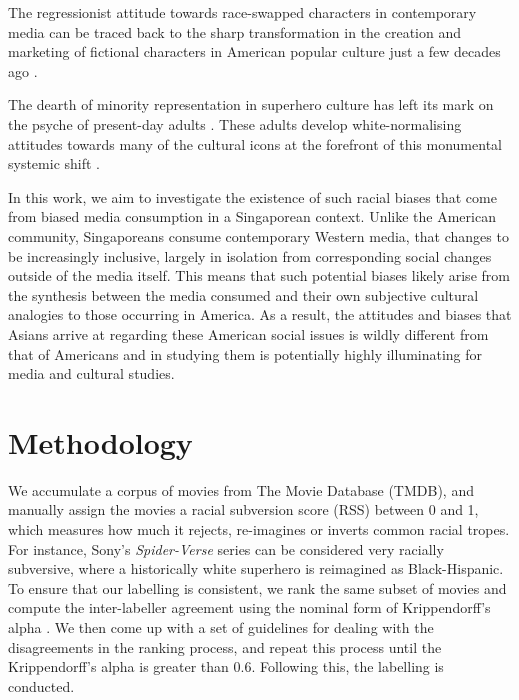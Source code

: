 \documentclass[%
 reprint,
 amsmath,amssymb,
 aps,
]{revtex4-2}
\begin{document}
The regressionist attitude towards race-swapped characters in contemporary media can be traced back to the sharp transformation in the creation and marketing of fictional characters in American popular culture just a few decades ago \cite{fu_fear_2015}.

The dearth of minority representation in superhero culture has left its mark on the psyche of present-day adults \cite{fu_fear_2015, mastro_portrayal_2000, dennis_gazing_2009}. These adults develop white-normalising attitudes towards many of the cultural icons at the forefront of this monumental systemic shift \cite{holtzman_media_2014}.

In this work, we aim to investigate the existence of such racial biases that come from biased media consumption in a Singaporean context. Unlike the American community, Singaporeans consume contemporary Western media, that changes to be increasingly inclusive, largely in isolation from corresponding social changes outside of the media itself. This means that such potential biases likely arise from the synthesis between the media consumed and their own subjective cultural analogies to those occurring in America. As a result, the attitudes and biases that Asians arrive at regarding these American social issues is wildly different from that of Americans and in studying them is potentially highly illuminating for media and cultural studies.



\section{\label{sec:methodology}Methodology}


We accumulate a corpus of movies from The Movie Database (TMDB), and manually assign the movies a racial subversion score (RSS) between 0 and 1, which measures how much it rejects, re-imagines or inverts common racial tropes. For instance, Sony's \emph{Spider-Verse} series can be considered very racially subversive, where a historically white superhero is reimagined as Black-Hispanic. To ensure that our labelling is consistent, we rank the same subset of movies and compute the inter-labeller agreement using the nominal form of Krippendorff's alpha \cite{krippendorff_content_2023}. We then come up with a set of guidelines for dealing with the disagreements in the ranking process, and repeat this process until the Krippendorff's alpha is greater than 0.6. Following this, the labelling is conducted.
\end{document}
